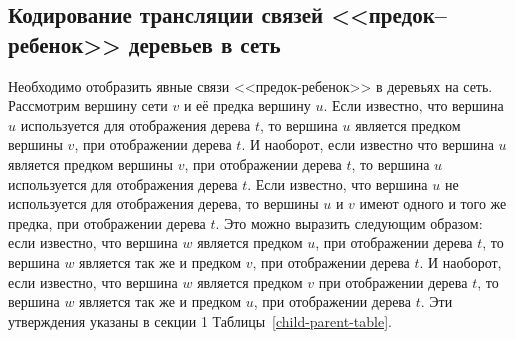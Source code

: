 \FloatBarrier
\subsection{Кодирование трансляции связей <<предок--ребенок>> деревьев в сеть}
\label{sec:parent-child}

Необходимо отобразить явные связи <<предок-ребенок>> в деревьях на сеть.
Рассмотрим вершину сети $v$ и её предка вершину $u$.
Если известно, что вершина $u$ используется для отображения дерева $t$, то вершина $u$ является предком вершины $v$, при отображении дерева $t$.
И наоборот, если известно что вершина $u$ является предком вершины $v$, при отображении дерева $t$, то вершина $u$ используется для отображения дерева $t$.
Если известно, что вершина $u$ не используется для отображения дерева, то вершины $u$ и $v$ имеют одного и того же предка, при отображении дерева $t$.
Это можно выразить следующим образом: если известно, что вершина $w$ является предком $u$, при отображении дерева $t$, то вершина $w$ является так же и предком $v$, при отображении дерева $t$.
И наоборот, если известно, что вершина $w$ является предком $v$ при отображении дерева $t$, то вершина $w$ является так же и предком $u$, при отображении дерева $t$.
Эти утверждения указаны в секции 1 Таблицы~\ref{child-parent-table}.

